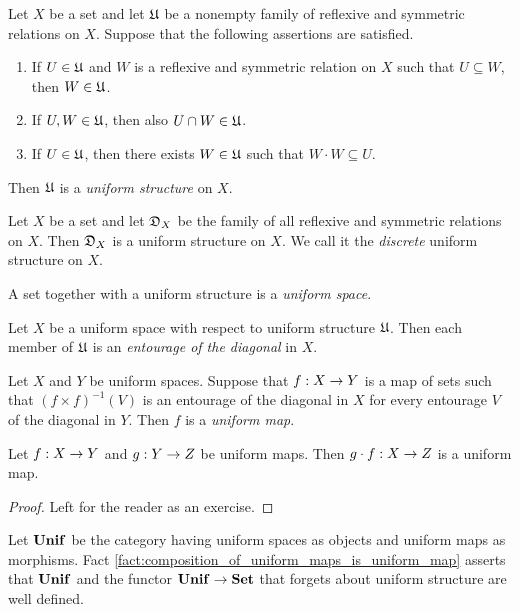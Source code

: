 \begin{definition}
	Let $X$ be a set and let ${\mathfrak U}$ be a nonempty family of reflexive and symmetric relations on $X$. Suppose that the following assertions are satisfied.
	\begin{enumerate}[label=\textbf{(\arabic*)}, leftmargin=3.0em]
		\item If $U \in {\mathfrak U}$ and $W$ is a reflexive and symmetric relation on $X$ such that $U \subseteq W$, then $W \in {\mathfrak U}$.
		\item If $U,W \in {\mathfrak U}$, then also $U\cap W \in {\mathfrak U}$.
		\item If $U \in {\mathfrak U}$, then there exists $W \in {\mathfrak U}$ such that $W\cdot W \subseteq U$.
	\end{enumerate}
	Then ${\mathfrak U}$ is a \textit{uniform structure} on $X$.
\end{definition}

\begin{example}\label{example:discrete_uniform_structure}
	Let $X$ be a set and let ${\mathfrak D}_X$ be the family of all reflexive and symmetric relations on $X$. Then ${\mathfrak D}_X$ is a uniform structure on $X$. We call it the \textit{discrete} uniform structure on $X$.
\end{example}

\begin{definition}
	A set together with a uniform structure is a \textit{uniform space}.
\end{definition}

\begin{definition}
	Let $X$ be a uniform space with respect to uniform structure ${\mathfrak U}$. Then each member of ${\mathfrak U}$ is an \textit{entourage of the diagonal} in $X$.
\end{definition}

\begin{definition}
	Let $X$ and $Y$ be uniform spaces. Suppose that $f:X\rightarrow Y$ is a map of sets such that $\left(f\times f\right)^{-1}(V)$ is an entourage of the diagonal in $X$ for every entourage $V$ of the diagonal in $Y$. Then $f$ is a \textit{uniform map}.
\end{definition}

\begin{fact}\label{fact:composition_of_uniform_maps_is_uniform_map}
	Let $f:X \rightarrow Y$ and $g:Y \rightarrow Z$ be uniform maps. Then $g\cdot f:X\rightarrow Z$ is a uniform map.
\end{fact}
\begin{proof}
	Left for the reader as an exercise.
\end{proof}
\noindent
Let $\mathbf{Unif}$ be the category having uniform spaces as objects and uniform maps as morphisms. Fact \ref{fact:composition_of_uniform_maps_is_uniform_map} asserts that $\mathbf{Unif}$ and the functor $\mathbf{Unif} \rightarrow \mathbf{Set}$ that forgets about uniform structure are well defined.

